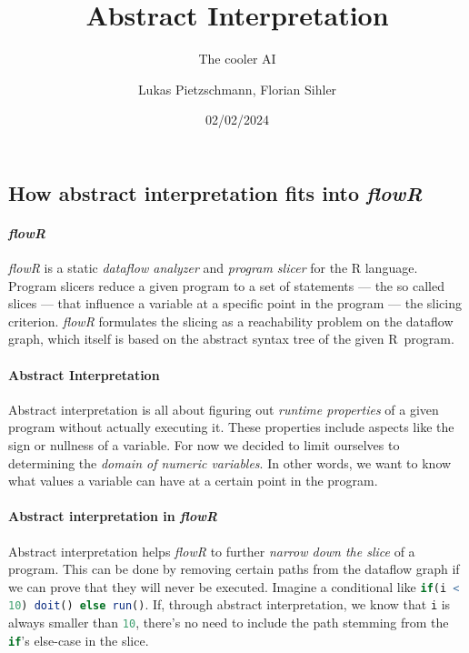 \documentclass[color,coloraccent=red!60!black,listings]{poster}
\title{Abstract Interpretation}
\subtitle{The cooler AI}
\author{Lukas Pietzschmann, Florian Sihler}
\institute{Institute of Software Engineering and Programming Languages}
\date{02/02/2024}
\def\flowr{\textit{flowR}}
\def\rc#1{\lstinline[language=r]{#1}}
\def\uselogo#1{\scalebox{#1}{\usebox\flowrlogob}}
\begin{document}
\maketitle


\begin{multicols}{3}
	\begin{minipage}{\dimexpr2\columnwidth+\columnsep\relax}
		\section*{How abstract interpretation fits into \flowr}
		\paragraph{\flowr}\flowr{} is a static \emph{dataflow analyzer} and
		\emph{program slicer} for the R language. Program slicers reduce a given program
		to a set of statements --- the so called slices --- that influence a variable at
		a specific point in the program --- the slicing criterion. \flowr{} formulates
		the slicing as a reachability problem on the dataflow graph, which itself is
		based on the abstract syntax tree of the given R~program.
		\paragraph{Abstract Interpretation} Abstract interpretation is all about
		figuring out \emph{runtime properties} of a given program without actually
		executing it. These properties include aspects like the sign or nullness of a
		variable. For now we decided to limit ourselves to determining the \emph{domain
		of numeric variables}. In other words, we want to know what values a variable
		can have at a certain point in the program.
		\paragraph{Abstract interpretation in \flowr} Abstract interpretation helps
		\flowr{} to further \emph{narrow down the slice} of a program. This can be done
		by removing certain paths from the dataflow graph if we can prove that they will
		never be executed. Imagine a conditional like \rc{if(i < 10) doit() else run()}.
		If, through abstract interpretation, we know that \rc{i} is always smaller than
		\rc{10}, there's no need to include the path stemming from the \rc{if}'s
		else-case in the slice.

\end{minipage}
\end{multicols}
\end{document}
